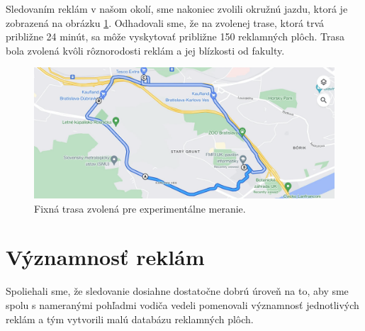 Sledovaním reklám v našom okolí, sme nakoniec zvolili okružnú jazdu, ktorá je zobrazená na obrázku \ref{img:road}. Odhadovali sme, že na zvolenej trase, ktorá trvá približne 24 minút, sa môže vyskytovať približne 150 reklamných plôch. Trasa bola zvolená kvôli rôznorodosti reklám a jej blízkosti od fakulty.
\\
\begin{figure}[ht]
    \centering
    \includegraphics[width=1\textwidth]{images/03/map.png}
    \caption{Fixná trasa zvolená pre experimentálne meranie.}
    \label{img:road}
\end{figure}


\section{Významnosť reklám}

Spoliehali sme, že sledovanie dosiahne dostatočne dobrú úroveň na to, aby sme spolu s nameranými pohľadmi vodiča vedeli pomenovali významnosť jednotlivých reklám a tým vytvorili malú databázu reklamných plôch. 

